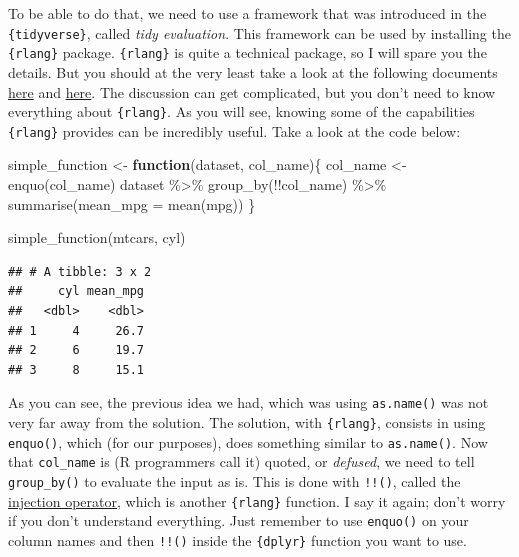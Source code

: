 \documentclass[
]{article}
\newenvironment{Shaded}{\begin{snugshade}}{\end{snugshade}}
\newcommand{\AttributeTok}[1]{\textcolor[rgb]{0.77,0.63,0.00}{#1}}
\newcommand{\ControlFlowTok}[1]{\textcolor[rgb]{0.13,0.29,0.53}{\textbf{#1}}}
\newcommand{\FunctionTok}[1]{\textcolor[rgb]{0.00,0.00,0.00}{#1}}
\newcommand{\NormalTok}[1]{#1}
\newcommand{\OtherTok}[1]{\textcolor[rgb]{0.56,0.35,0.01}{#1}}
\newcommand{\SpecialCharTok}[1]{\textcolor[rgb]{0.00,0.00,0.00}{#1}}
\begin{document}
To be able to do that, we need to use a framework that was introduced in the \texttt{\{tidyverse\}},
called \emph{tidy evaluation}. This framework can be used by installing the \texttt{\{rlang\}} package.
\texttt{\{rlang\}} is quite a technical package, so I will spare you the details. But you should at
the very least take a look at the following documents
\href{http://dplyr.tidyverse.org/articles/programming.html}{here} and
\href{https://rlang.r-lib.org/reference/topic-data-mask.html}{here}. The
discussion can get complicated, but you don't need to know everything about \texttt{\{rlang\}}.
As you will see, knowing some of the capabilities \texttt{\{rlang\}} provides can be incredibly useful.
Take a look at the code below:

\begin{Shaded}
\begin{Highlighting}[]
\NormalTok{simple\_function }\OtherTok{\textless{}{-}} \ControlFlowTok{function}\NormalTok{(dataset, col\_name)\{}
\NormalTok{  col\_name }\OtherTok{\textless{}{-}} \FunctionTok{enquo}\NormalTok{(col\_name)}
\NormalTok{  dataset }\SpecialCharTok{\%\textgreater{}\%}
    \FunctionTok{group\_by}\NormalTok{(}\SpecialCharTok{!!}\NormalTok{col\_name) }\SpecialCharTok{\%\textgreater{}\%}
    \FunctionTok{summarise}\NormalTok{(}\AttributeTok{mean\_mpg =} \FunctionTok{mean}\NormalTok{(mpg))}
\NormalTok{\}}


\FunctionTok{simple\_function}\NormalTok{(mtcars, cyl)}
\end{Highlighting}
\end{Shaded}

\begin{verbatim}
## # A tibble: 3 x 2
##     cyl mean_mpg
##   <dbl>    <dbl>
## 1     4     26.7
## 2     6     19.7
## 3     8     15.1
\end{verbatim}

As you can see, the previous idea we had, which was using \texttt{as.name()} was not very far away from
the solution. The solution, with \texttt{\{rlang\}}, consists in using \texttt{enquo()}, which (for our purposes),
does something similar to \texttt{as.name()}. Now that \texttt{col\_name} is (R programmers call it) quoted, or
\emph{defused}, we need to tell \texttt{group\_by()} to evaluate the input as is. This is done with \texttt{!!()},
called the \href{https://rlang.r-lib.org/reference/injection-operator.html}{injection operator}, which
is another \texttt{\{rlang\}} function. I say it again; don't worry if you don't understand everything. Just
remember to use \texttt{enquo()} on your column names and then \texttt{!!()} inside the \texttt{\{dplyr\}} function you
want to use.
\end{document}
